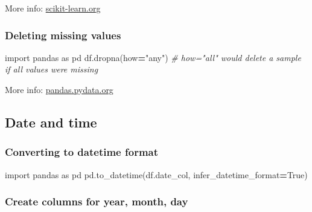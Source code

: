 \documentclass[
]{book}
\newenvironment{Shaded}{\begin{snugshade}}{\end{snugshade}}
\newcommand{\CommentTok}[1]{\textcolor[rgb]{0.56,0.35,0.01}{\textit{#1}}}
\newcommand{\ImportTok}[1]{#1}
\newcommand{\NormalTok}[1]{#1}
\newcommand{\OperatorTok}[1]{\textcolor[rgb]{0.81,0.36,0.00}{\textbf{#1}}}
\newcommand{\StringTok}[1]{\textcolor[rgb]{0.31,0.60,0.02}{#1}}
\newcommand{\VariableTok}[1]{\textcolor[rgb]{0.00,0.00,0.00}{#1}}
\begin{document}
More info:
\href{https://scikit-learn.org/stable/modules/generated/sklearn.impute.IterativeImputer.html}{scikit-learn.org}\\

\hypertarget{deleting-missing-values}{%
\subsubsection{Deleting missing values}\label{deleting-missing-values}}

\begin{Shaded}
\begin{Highlighting}[]
\ImportTok{import}\NormalTok{ pandas }\ImportTok{as}\NormalTok{ pd}
\NormalTok{df.dropna(how}\OperatorTok{=}\StringTok{"any"}\NormalTok{) }\CommentTok{\# how="all" would delete a sample if all values were missing}
\end{Highlighting}
\end{Shaded}

More info:
\href{https://pandas.pydata.org/pandas-docs/version/0.18.1/generated/pandas.DataFrame.dropna.html}{pandas.pydata.org}\\

\hypertarget{date-and-time}{%
\subsection{Date and time}\label{date-and-time}}

\hypertarget{converting-to-datetime-format}{%
\subsubsection{Converting to datetime format}\label{converting-to-datetime-format}}

\begin{Shaded}
\begin{Highlighting}[]
\ImportTok{import}\NormalTok{ pandas }\ImportTok{as}\NormalTok{ pd}
\NormalTok{pd.to\_datetime(df.date\_col, infer\_datetime\_format}\OperatorTok{=}\VariableTok{True}\NormalTok{)}
\end{Highlighting}
\end{Shaded}

\hypertarget{create-columns-for-year-month-day}{%
\subsubsection{Create columns for year, month, day}\label{create-columns-for-year-month-day}}
\end{document}
